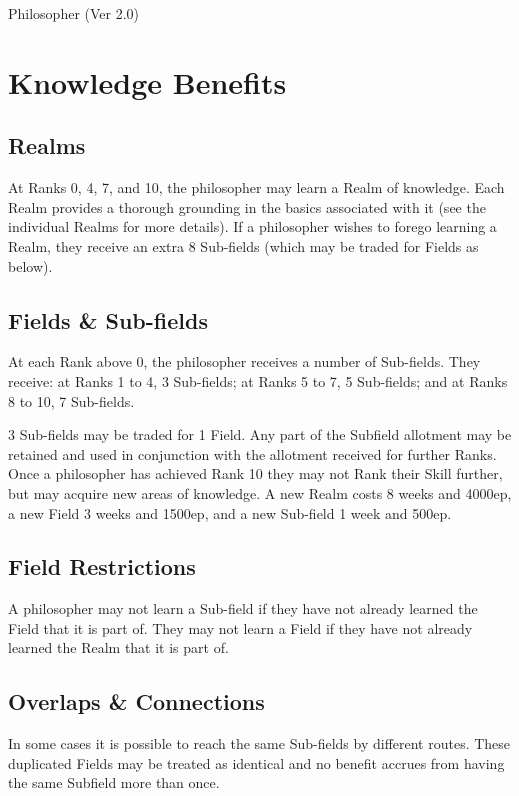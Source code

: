 \begin{Chapter}{Philosopher (Ver 2.0)}
\section{Knowledge Benefits}

\subsection{Realms}

At Ranks 0, 4, 7, and 10, the philosopher may learn a Realm of
knowledge.  Each Realm provides a thorough grounding in the basics
associated with it (see the individual Realms for more details).  If a
philosopher wishes to forego learning a Realm, they receive an extra 8
Sub-fields (which may be traded for Fields as below).

\subsection{Fields \& Sub-fields}

At each Rank above 0, the philosopher receives a number of Sub-fields.
They receive: at Ranks 1 to 4, 3 Sub-fields; at Ranks 5 to 7, 5
Sub-fields; and at Ranks 8 to 10, 7 Sub-fields.

3 Sub-fields may be traded for 1 Field.  Any part of the Subfield
allotment may be retained and used in conjunction with the allotment
received for further Ranks.  Once a philosopher has achieved Rank 10
they may not Rank their Skill further, but may acquire new areas of
knowledge.  A new Realm costs 8 weeks and 4000ep, a new Field 3 weeks
and 1500ep, and a new Sub-field 1 week and 500ep.

\subsection{Field Restrictions}

A philosopher may not learn a Sub-field if they have not already
learned the Field that it is part of.  They may not learn a Field if
they have not already learned the Realm that it is part of.

\subsection{Overlaps \& Connections}

In some cases it is possible to reach the same Sub-fields by different
routes.  These duplicated Fields may be treated as identical and no
benefit accrues from having the same Subfield more than once.


\end{Chapter}
